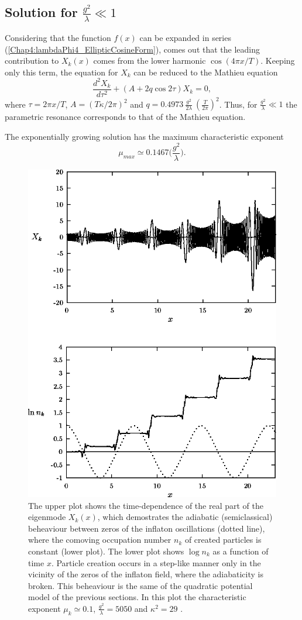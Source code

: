 \documentclass[11pt,a4paper,twoside]{book}
\begin{document}
\subsection*{Solution for $ \frac{g^{2}}{\lambda} \ll 1 $}
Considering that the function $ f(x) $ can be expanded in series (\ref{Chap4:lambdaPhi4_EllipticCosineForm}), comes out that the leading contribution to $ X_{k}(x) $ comes from the lower harmonic $ \cos(4\pi x/T) $. Keeping only this term, the equation for $ X_{k} $ can be reduced to the Mathieu equation
\begin{equation}
\label{Chap4:lambdaPhi4_MathieuEquationCase}
\frac{d^{2}X_{k}}{d\tau^{2}} + (A+2q\cos 2\tau)X_{k}=0,
\end{equation}
where $ \tau=2\pi x/T $, $ A=(T\kappa/2\pi)^{2} $ and $ q=0.4973\ \frac{g^{2}}{2\lambda}\ (\frac{T}{2\pi})^{2} $. Thus, for $ \frac{g^{2}}{\lambda} \ll 1 $ the parametric resonance corresponds to that of the Mathieu equation. 

The exponentially growing solution has the maximum characteristic exponent
\begin{equation}
\mu_{max} \simeq 0.1467 \Bigg(\frac{g^{2}}{\lambda}\Bigg).
\end{equation}
\begin{figure}[h]
	\centering
	\includegraphics[width=0.6\linewidth, height=0.45\textheight]{Images/Chap4/ConformalTheory_Fig7}
	\caption{The upper plot shows the time-dependence of the real part of the eigenmode $ X_{k}(x) $, which demostrates the adiabatic (semiclassical) beheaviour between zeros of the inflaton oscillations (dotted line), where the comoving occupation number $ n_{k} $ of created particles is constant (lower plot). The lower plot shows $\log n_{k}$ as a function of time $ x $. Particle creation occurs in a step-like manner only in the vicinity of the zeros of the inflaton field, where the adiabaticity is broken. This beheaviour is the same of the quadratic potential model of the previous sections. In this plot the characteristic exponent $ \mu_{k}\simeq 0.1 $, $ \frac{g^{2}}{\lambda}=5050 $ and $\kappa^{2}=29$ \cite{Chap4:ModelLambdaPhi4Reference}.}
	\label{fig:conformaltheoryfig7}
\end{figure}
\end{document}
